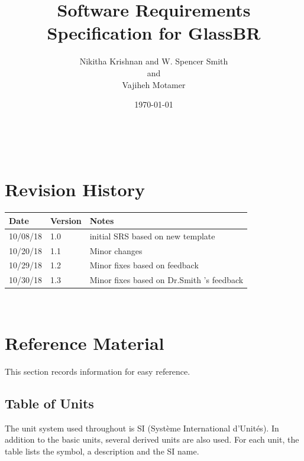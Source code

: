 \documentclass[12pt]{article}
\newcommand{\progname}{GlassBR}
\begin{document}
\title{Software Requirements Specification for \progname} 
\author{Nikitha Krishnan and W. Spencer Smith \\and\\ Vajiheh Motamer}
\date{\today}

\maketitle

~\newpage



\section{Revision History}

\begin{tabularx}{\textwidth}{p{3cm}p{2cm}X}
\toprule {\bf Date} & {\bf Version} & {\bf Notes}\\
\midrule
10/08/18 & 1.0 & initial SRS based on new template\\
10/20/18 & 1.1 & Minor changes\\
10/29/18 & 1.2 & Minor fixes based on feedback\\
10/30/18 & 1.3 & Minor fixes based on Dr.Smith 's feedback\\

\bottomrule
\end{tabularx}



~\newpage

\section{Reference Material}

This section records information for easy reference.

\subsection{Table of Units}

The unit system used throughout is SI (Syst\`{e}me International d'Unit\'{e}s). In addition to the
basic units, several derived units are also used. For each unit, the table lists the symbol, a
description and the SI name.
~\newline
\end{document}

